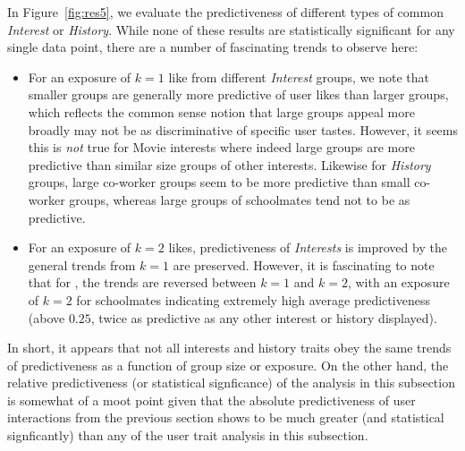 In Figure~\ref{fig:res5}, we evaluate the predictiveness of different
types of common \textit{Interest} or \textit{History}.  While none of
these results are statistically significant for any single data point,
there are a number of fascinating trends to observe here:
\begin{itemize}
\item For an exposure of $k=1$ like from different \textit{Interest}
groups, we note that smaller groups are generally more predictive of
user likes than larger groups, which reflects the common sense notion
that large groups appeal more broadly may not be as discriminative of
specific user tastes.  However, it seems this is \emph{not} true for
Movie interests where indeed large groups are more predictive than
similar size groups of other interests. Likewise for \textit{History}
groups, large co-worker groups seem to be more predictive than small
co-worker groups, whereas large groups of schoolmates tend not to be
as predictive.  
\item For an exposure of $k=2$ likes, predictiveness of
\textit{Interests} is improved by the general trends from $k=1$
are preserved.  However, it is fascinating to note that 
for , the trends are reversed between $k=1$
and $k=2$, with an exposure of $k=2$ for schoolmates indicating
extremely high average predictiveness (above $0.25$, twice
as predictive as any other interest or history displayed).
\end{itemize}
In short, it appears that not all interests and history traits obey
the same trends of predictiveness as a function of group size or
exposure.  On the other hand, the relative predictiveness (or
statistical signficance) of the analysis in this subsection is somewhat
of a moot point given that the absolute predictiveness of user
interactions from the previous section shows to be much greater (and
statistical signficantly) than any of the user trait analysis in this
subsection.




